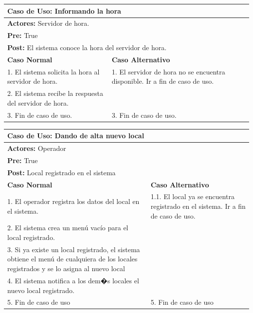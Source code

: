 \documentclass[a4paper,11pt] {article}
\begin{document}
\begin{center}
	\begin{tabular}{ | p{6.5cm} | p{6.5cm} | }
		\hline
			\multicolumn{2}{|l|}{\textbf{Caso de Uso:} Informando la hora} \\
		\hline
			\multicolumn{2}{|l|}{\textbf{Actores:} Servidor de hora.} \\
		\hline
			\multicolumn{2}{|l|}{\textbf{Pre:} True} \\
		\hline
			\multicolumn{2}{|l|}{\textbf{Post:} El sistema conoce la hora del servidor de hora.} \\
		\hline
		\textbf{Caso Normal} & \textbf{Caso Alternativo}	\\
		\hline
		1. El sistema solicita la hora al servidor de hora. & 1. El servidor de hora no se encuentra disponible. Ir a fin de caso de uso.	\\
		\hline
		2. El sistema recibe la respuesta del servidor de hora. &	\\
		\hline
		3. Fin de caso de uso. & 3. Fin de caso de uso.	\\
		\hline
	\end{tabular}
\end{center}

\begin{center}
	\begin{tabular}{ | p{6.5cm} | p{6.5cm} | }
		\hline
			\multicolumn{2}{|l|}{\textbf{Caso de Uso:} Dando de alta nuevo local} \\
		\hline
			\multicolumn{2}{|l|}{\textbf{Actores:} Operador} \\
		\hline
			\multicolumn{2}{|l|}{\textbf{Pre:} True} \\
		\hline
			\multicolumn{2}{|l|}{\textbf{Post:} Local registrado en el sistema} \\
		\hline
		\textbf{Caso Normal} & \textbf{Caso Alternativo}	\\
		\hline
		1. El operador registra los datos del local en el sistema. & 1.1. El local ya se encuentra registrado en el sistema. Ir a fin de caso de uso.	\\
		\hline
		2. El sistema crea un men\'u vac\'io para el local registrado. &	\\
		\hline
		3. Si ya existe un local registrado, el sistema obtiene el men\'u de cualquiera de los locales registrados y se lo asigna al nuevo local &	\\
		\hline
		4. El sistema notifica a los dem�s locales el nuevo local registrado. &	\\
		\hline
		5. Fin de caso de uso &	5. Fin de caso de uso \\
		\hline
	\end{tabular}
\end{center}
\end{document}
